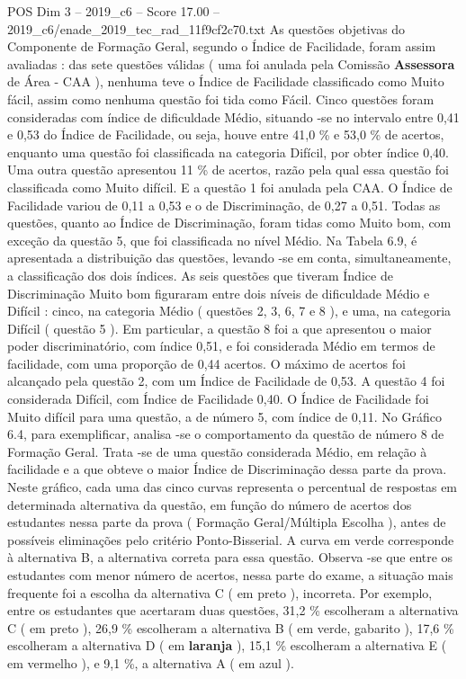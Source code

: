 \begin{textsample}{POS Dim 3 – 2019\_c6 – Score 17.00 – 2019\_c6/enade\_2019\_tec\_rad\_11f9cf2c70.txt}
As questões objetivas do Componente de Formação Geral, segundo o Índice de Facilidade, foram assim avaliadas : das sete questões válidas ( uma foi anulada pela Comissão \textbf{Assessora} de Área - CAA ), nenhuma teve o Índice de Facilidade classificado como Muito fácil, assim como nenhuma questão foi tida como Fácil.
Cinco questões foram consideradas com índice de dificuldade Médio, situando -se no intervalo entre 0,41 e 0,53 do Índice de Facilidade, ou seja, houve entre 41,0 \% e 53,0 \% de acertos, enquanto uma questão foi classificada na categoria Difícil, por obter índice 0,40.
Uma outra questão apresentou 11 \% de acertos, razão pela qual essa questão foi classificada como Muito difícil.
E a questão 1 foi anulada pela CAA.
O Índice de Facilidade variou de 0,11 a 0,53 e o de Discriminação, de 0,27 a 0,51.
Todas as questões, quanto ao Índice de Discriminação, foram tidas como Muito bom, com exceção da questão 5, que foi classificada no nível Médio.
Na Tabela 6.9, é apresentada a distribuição das questões, levando -se em conta, simultaneamente, a classificação dos dois índices.
As seis questões que tiveram Índice de Discriminação Muito bom figuraram entre dois níveis de dificuldade Médio e Difícil : cinco, na categoria Médio ( questões 2, 3, 6, 7 e 8 ), e uma, na categoria Difícil ( questão 5 ).
Em particular, a questão 8 foi a que apresentou o maior poder discriminatório, com índice 0,51, e foi considerada Médio em termos de facilidade, com uma proporção de 0,44 acertos.
O máximo de acertos foi alcançado pela questão 2, com um Índice de Facilidade de 0,53.
A questão 4 foi considerada Difícil, com Índice de Facilidade 0,40.
O Índice de Facilidade foi Muito difícil para uma questão, a de número 5, com índice de 0,11.
No Gráfico 6.4, para exemplificar, analisa -se o comportamento da questão de número 8 de Formação Geral.
Trata -se de uma questão considerada Médio, em relação à facilidade e a que obteve o maior Índice de Discriminação dessa parte da prova.
Neste gráfico, cada uma das cinco curvas representa o percentual de respostas em determinada alternativa da questão, em função do número de acertos dos estudantes nessa parte da prova ( Formação Geral/Múltipla Escolha ), antes de possíveis eliminações pelo critério Ponto-Bisserial.
A curva em verde corresponde à alternativa B, a alternativa correta para essa questão.
Observa -se que entre os estudantes com menor número de acertos, nessa parte do exame, a situação mais frequente foi a escolha da alternativa C ( em preto ), incorreta.
Por exemplo, entre os estudantes que acertaram duas questões, 31,2 \% escolheram a alternativa C ( em preto ), 26,9 \% escolheram a alternativa B ( em verde, gabarito ), 17,6 \% escolheram a alternativa D ( em \textbf{laranja} ), 15,1 \% escolheram a alternativa E ( em vermelho ), e 9,1 \%, a alternativa A ( em azul ).

\end{textsample}
